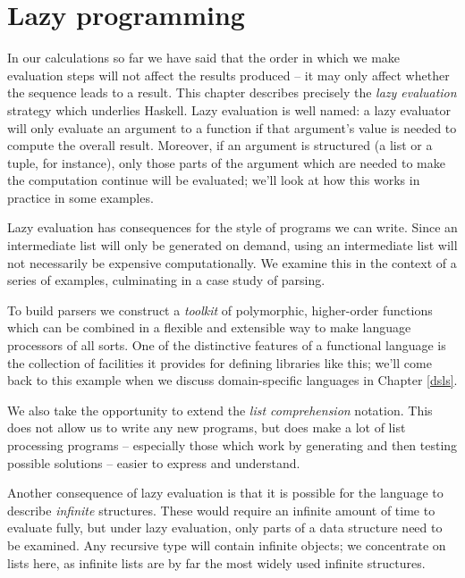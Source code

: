 
\chapter{Lazy programming}
\chapstart
\label{lazy}

In our calculations so far we have said that the order in which we make
evaluation steps will not affect the results produced -- it may only affect
whether the sequence leads to a result. This chapter describes precisely the
\emph{lazy evaluation} strategy which underlies Haskell. Lazy evaluation is
well named: a lazy evaluator will only evaluate an argument to a function if
that argument's value is needed to compute the overall result.
Moreover, if an argument is structured (a list or a tuple, for instance),
only those parts of the argument which are needed to make the computation continue will be evaluated; we'll look at how this works in practice in some examples.

Lazy evaluation has consequences for the style of programs we can write. 
Since an intermediate list
will only be generated on demand, using an intermediate list will not
necessarily be expensive computationally. We examine this in the context of a
series of examples, culminating in a case study of parsing. 

To build
parsers we construct a \emph{toolkit} of polymorphic, higher-order
functions which can be combined in a flexible and extensible way to make
language processors of all sorts. One of the distinctive features of a 
functional language is the collection of facilities it provides for defining libraries like this; we'll come back to this example when we discuss domain-specific languages in Chapter \ref{dsls}.

We also take the opportunity to extend the \emph{list comprehension}
notation. This does not allow us to write any new programs, but does
make a lot of list processing programs -- especially those which work by
generating and then testing possible solutions
-- easier to express and understand.

Another consequence of lazy evaluation is that it is
possible for the language to describe \emph{infinite} structures. These
would require an infinite amount of time to evaluate fully, but under lazy
evaluation, only parts of a data structure need to be examined.  Any recursive
type will contain infinite objects; we concentrate on lists here, as infinite
lists are
by far the  most widely used infinite structures.

